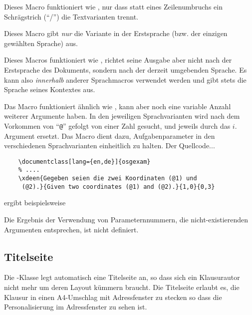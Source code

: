 \documentclass[
load=osgexam,
babel=ngerman
]{skdoc}
\begin{document}
\DescribeMacro{}Dieses Macro funktioniert wie
, nur dass statt eines Zeilenumbruchs ein Schrägstrich (``/'') die Textvarianten trennt.
\medskip

\DescribeMacro{}Dieses Macro gibt \emph{nur} die
Variante in der Erstsprache (bzw. der einzigen gewählten Sprache) aus.
\medskip

\DescribeMacro{}Dieses Macros funktioniert wie
, richtet seine Ausgabe aber nicht nach der Erstsprache des Dokuments, sondern nach der derzeit umgebenden
Sprache. Es kann also \emph{innerhalb} anderer Sprachmacros verwendet werden und gibt stets die Sprache seines Kontextes
aus.
\medskip

\DescribeMacro{} %
  Das Macro  funktioniert ähnlich wie , kann aber noch eine variable Anzahl weiterer Argumente
  haben. In den jeweiligen Sprachvarianten wird nach dem Vorkommen von ``\verb!@!'' gefolgt von einer Zahl 
  gesucht, und jeweils durch das $i$. Argument ersetzt. Das Macro dient dazu, Aufgabenparameter in den verschiedenen
  Sprachvarianten einheitlich zu halten.
  Der Quellcode...
  \begin{lstlisting}
    \documentclass[lang={en,de}]{osgexam}
    % ....
    \xdeen{Gegeben seien die zwei Koordinaten (@1) und
     (@2).}{Given two coordinates (@1) and (@2).}{1,0}{0,3}
  \end{lstlisting}
\noindent  ergibt beispielsweise

\noindent{}
\medskip

Die Ergebnis der Verwendung von Parameternnummern, die nicht-existierenden Argumenten entsprechen, ist nicht definiert.
\subsection{Titelseite}
\label{sec:macro:title}
Die \thepkg-Klasse legt automatisch eine Titelseite an, so dass sich ein Klausurautor nicht mehr um deren Layout kümmern
braucht.
Die Titelseite erlaubt es, die Klausur in einen A4-Umschlag mit Adressfenster zu stecken so dass die Personalisierung im
Adressfenster zu sehen ist.
\end{document}
